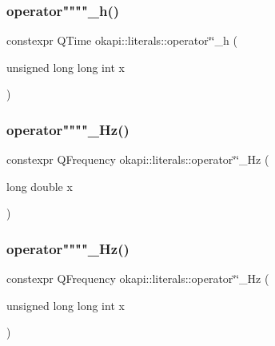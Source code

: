 \mbox{\label{namespaceokapi_1_1literals_a0d7788ca50c37d059b79a6d8363ea0f9}} 
\subsubsection{\texorpdfstring{operator""""\_h()}{operator""\_h()}\hspace{0.1cm}{\footnotesize\ttfamily [2/2]}}
{\footnotesize\ttfamily constexpr Q\+Time okapi\+::literals\+::operator\char`\"{}\char`\"{}\+\_\+h (\begin{DoxyParamCaption}\item[{unsigned long long int}]{x }\end{DoxyParamCaption})}

\mbox{\label{namespaceokapi_1_1literals_a5eebec7681b16d83e30ec18032e85229}} 
\subsubsection{\texorpdfstring{operator""""\_Hz()}{operator""\_Hz()}\hspace{0.1cm}{\footnotesize\ttfamily [1/2]}}
{\footnotesize\ttfamily constexpr Q\+Frequency okapi\+::literals\+::operator\char`\"{}\char`\"{}\+\_\+\+Hz (\begin{DoxyParamCaption}\item[{long double}]{x }\end{DoxyParamCaption})}

\mbox{\label{namespaceokapi_1_1literals_a04d29d461c1f7eb8da83798d144be459}} 
\subsubsection{\texorpdfstring{operator""""\_Hz()}{operator""\_Hz()}\hspace{0.1cm}{\footnotesize\ttfamily [2/2]}}
{\footnotesize\ttfamily constexpr Q\+Frequency okapi\+::literals\+::operator\char`\"{}\char`\"{}\+\_\+\+Hz (\begin{DoxyParamCaption}\item[{unsigned long long int}]{x }\end{DoxyParamCaption})}

